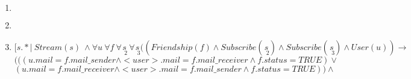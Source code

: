 \documentclass[a4paper,10pt]{article}
\begin{document}
	\begin{enumerate}
	    \item
		\begin{equation}
		[u.* | \ User(u) \ \wedge \forall \underset{\ \ 2}{u} (User(\underset{\ \ 2}{u}) \rightarrow (( \forall f ( Friendship(f) \rightarrow (f.status = False \wedge(f.mail\_sender = \underset{\ \ 2}{u}.mail \vee 
		\end{equation}
		\begin{equation}
		f.mail\_receiver = \underset{\ \ 2}{u}.mail)))) \vee ( \exists \underset{\ \ 2}{f} (Friendship(\underset{\ \ 2}{f}) \rightarrow (\underset{\ \ 2}{f}.status = True \wedge(\underset{\ \ 2}{f}.mail\_sender = \underset{\ \ 2}{u}.mail \vee 
		\end{equation}  
		\begin{equation}
		\underset{\ \ 2}{f}.mail\_receiver = \underset{\ \ 2}{u}.mail)))) \vee ( \exists \underset{\ \ 3}{f} \underset{\ \ 4}{f} (F(\underset{\ \ 3}{f} ) \rightarrow (\underset{\ \ 3}{f}.status = True \wedge (\underset{\ \ 3}{f}.mail\_sender = \underset{\ \ 2}{u}.mail \vee
		\end{equation}  
		\begin{equation}
		\underset{\ \ 3}{f}.mail\_receiver = \underset{\ \ 2}{u}.mail))) \wedge Friendship(\underset{\ \ 4}{f}) \rightarrow (\underset{\ \ 4}{f}.status = True \wedge (\underset{\ \ 4}{f}.mail\_sender = \underset{\ \ 2}{u}.mail \vee
		\end{equation}
		\begin{equation}
		\underset{\ \ 4}{f}.mail\_receiver = \underset{\ \ 2}{u}.mail)) \wedge (\underset{\ \ 3}{f} \ != \underset{\ \ 4}{f}))))]
		\end{equation}
	    \item
	    \item
	         \begin{equation}
		[s.* | \ Stream(s) \ \wedge \forall u \ \forall f \ \forall \underset{\ \ 2}{s} \ \forall \underset{\ \ 3}{s} ((Friendship(f) \wedge Subscribe(\underset{\ \ 2}{s}) \wedge Subscribe(\underset{\ \ 3}{s}) \wedge User(u)) \rightarrow
		\end{equation} 
		\begin{equation}
		( ( (u.mail = f.mail\_sender \wedge <user>.mail = f.mail\_receiver \wedge f.status = TRUE ) \vee 
		\end{equation} 
		\begin{equation}
		(u.mail = f.mail\_receiver \wedge <user>.mail = f.mail\_sender \wedge f.status = TRUE ) ) \wedge 
		\end{equation} 

\end{enumerate}
\end{document}
